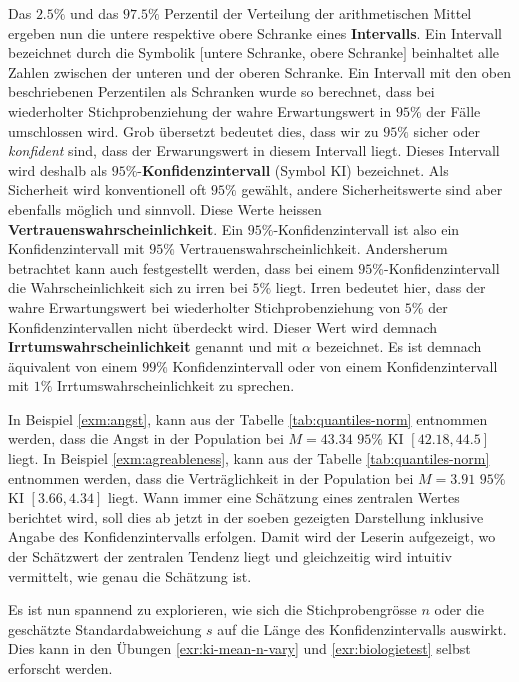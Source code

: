 \documentclass[
]{book}
\theoremstyle{definition}
\theoremstyle{definition}
\theoremstyle{definition}
\theoremstyle{definition}
\theoremstyle{remark}
\begin{document}
Das \(2.5\%\) und das \(97.5\%\) Perzentil der Verteilung der arithmetischen Mittel ergeben nun die untere respektive obere Schranke eines \label{customdef-interval}{\textbf{Intervalls}. Ein Intervall bezeichnet durch die Symbolik \([\)untere Schranke, obere Schranke\(]\) beinhaltet alle Zahlen zwischen der unteren und der oberen Schranke.} \label{customdef-confidence-interval}{Ein Intervall mit den oben beschriebenen Perzentilen als Schranken wurde so berechnet, dass bei wiederholter Stichprobenziehung der wahre Erwartungswert in \(95\%\) der Fälle umschlossen wird. Grob übersetzt bedeutet dies, dass wir zu \(95\%\) sicher oder \emph{konfident} sind, dass der Erwarungswert in diesem Intervall liegt. Dieses Intervall wird deshalb als \(95\%\)-\textbf{Konfidenzintervall} (Symbol KI) bezeichnet.}
\label{customdef-confidence-level}{Als Sicherheit wird konventionell oft \(95\%\) gewählt, andere Sicherheitswerte sind aber ebenfalls möglich und sinnvoll. Diese Werte heissen \textbf{Vertrauenswahrscheinlichkeit}. Ein \(95\%\)-Konfidenzintervall ist also ein Konfidenzintervall mit \(95\%\) Vertrauenswahrscheinlichkeit.} \label{customdef-erring-level}{Andersherum betrachtet kann auch festgestellt werden, dass bei einem \(95\%\)-Konfidenzintervall die Wahrscheinlichkeit sich zu irren bei \(5\%\) liegt. Irren bedeutet hier, dass der wahre Erwartungswert bei wiederholter Stichprobenziehung von \(5\%\) der Konfidenzintervallen nicht überdeckt wird. Dieser Wert wird demnach \textbf{Irrtumswahrscheinlichkeit} genannt und mit \(\alpha\) bezeichnet}. Es ist demnach äquivalent von einem \(99\%\) Konfidenzintervall oder von einem Konfidenzintervall mit \(1\%\) Irrtumswahrscheinlichkeit zu sprechen.

In Beispiel \ref{exm:angst}, kann aus der Tabelle \ref{tab:quantiles-norm} entnommen werden, dass die Angst in der Population bei \(M = 43.34\) \(95\%\) KI \([42.18,44.5]\) liegt. In Beispiel \ref{exm:agreableness}, kann aus der Tabelle \ref{tab:quantiles-norm} entnommen werden, dass die Verträglichkeit in der Population bei \(M = 3.91\) \(95\%\) KI \([3.66,4.34]\) liegt. Wann immer eine Schätzung eines zentralen Wertes berichtet wird, soll dies ab jetzt in der soeben gezeigten Darstellung inklusive Angabe des Konfidenzintervalls erfolgen. Damit wird der Leserin aufgezeigt, wo der Schätzwert der zentralen Tendenz liegt und gleichzeitig wird intuitiv vermittelt, wie genau die Schätzung ist.

Es ist nun spannend zu explorieren, wie sich die Stichprobengrösse \(n\) oder die geschätzte Standardabweichung \(s\) auf die Länge des Konfidenzintervalls auswirkt. Dies kann in den Übungen \ref{exr:ki-mean-n-vary} und \ref{exr:biologietest} selbst erforscht werden.
\end{document}
